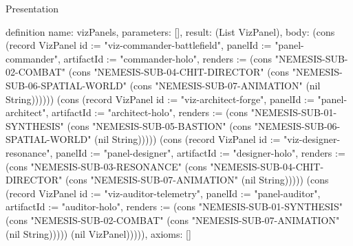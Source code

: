 \begin{lexlean}{Presentation}
\begin{semanticmodule}
definition{
  name: vizPanels,
  parameters: [],
  result: (List VizPanel),
  body: (cons (record VizPanel {id := "viz-commander-battlefield", panelId := "panel-commander", artifactId := "commander-holo", renders := (cons "NEMESIS-SUB-02-COMBAT" (cons "NEMESIS-SUB-04-CHIT-DIRECTOR" (cons "NEMESIS-SUB-06-SPATIAL-WORLD" (cons "NEMESIS-SUB-07-ANIMATION" (nil String)))))}) (cons (record VizPanel {id := "viz-architect-forge", panelId := "panel-architect", artifactId := "architect-holo", renders := (cons "NEMESIS-SUB-01-SYNTHESIS" (cons "NEMESIS-SUB-05-BASTION" (cons "NEMESIS-SUB-06-SPATIAL-WORLD" (nil String))))}) (cons (record VizPanel {id := "viz-designer-resonance", panelId := "panel-designer", artifactId := "designer-holo", renders := (cons "NEMESIS-SUB-03-RESONANCE" (cons "NEMESIS-SUB-04-CHIT-DIRECTOR" (cons "NEMESIS-SUB-07-ANIMATION" (nil String))))}) (cons (record VizPanel {id := "viz-auditor-telemetry", panelId := "panel-auditor", artifactId := "auditor-holo", renders := (cons "NEMESIS-SUB-01-SYNTHESIS" (cons "NEMESIS-SUB-02-COMBAT" (cons "NEMESIS-SUB-07-ANIMATION" (nil String))))}) (nil VizPanel))))),
  axioms: []
}


\end{semanticmodule}
\end{lexlean}
